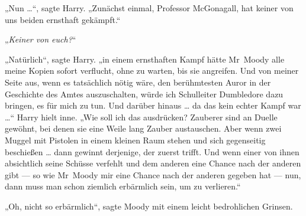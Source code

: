 „Nun …“, sagte Harry.
„Zunächst einmal, Professor McGonagall, hat keiner von uns beiden ernsthaft gekämpft.“

„\emph{Keiner von euch?}“

„Natürlich“, sagte Harry. „in einem ernsthaften Kampf hätte Mr~Moody alle meine Kopien sofort verflucht, ohne zu warten, bis sie angreifen. Und von meiner Seite aus, wenn es tatsächlich nötig wäre, den berühmtesten Auror in der Geschichte des Amtes auszuschalten, würde ich Schulleiter Dumbledore dazu bringen, es für mich zu tun. Und darüber hinaus … da das kein echter Kampf war …“ Harry hielt inne.
„Wie soll ich das ausdrücken? Zauberer sind an Duelle gewöhnt, bei denen sie eine Weile lang Zauber austauschen. Aber wenn zwei Muggel mit Pistolen in einem kleinen Raum stehen und sich gegenseitig beschießen … dann gewinnt derjenige, der zuerst trifft. Und wenn einer von ihnen absichtlich seine Schüsse verfehlt und dem anderen eine Chance nach der anderen gibt — so wie Mr~Moody mir eine Chance nach der anderen gegeben hat — nun, dann muss man schon ziemlich erbärmlich sein, um zu verlieren.“

„Oh, nicht so erbärmlich“, sagte Moody mit einem leicht bedrohlichen Grinsen.

